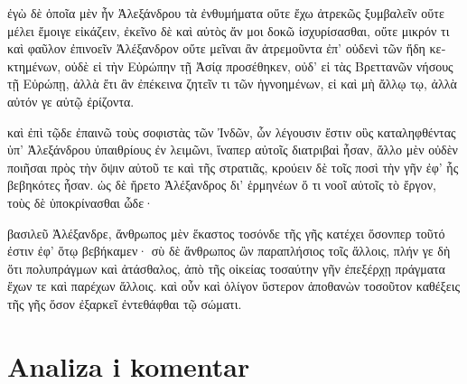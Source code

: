 {\large

\begin{greek}

\noindent  ἐγὼ δὲ ὁποῖα μὲν ἦν Ἀλεξάνδρου τὰ ἐνθυμήματα οὔτε ἔχω ἀτρεκῶς ξυμβαλεῖν οὔτε μέλει ἔμοιγε εἰκάζειν, ἐκεῖνο δὲ καὶ αὐτὸς ἄν μοι δοκῶ ἰσχυρίσασθαι, οὔτε μικρόν τι καὶ φαῦλον ἐπινοεῖν Ἀλέξανδρον οὔτε μεῖναι ἂν ἀτρεμοῦντα ἐπ' οὐδενὶ τῶν ἤδη κεκτημένων, οὐδὲ εἰ τὴν Εὐρώπην τῇ Ἀσίᾳ προσέθηκεν, οὐδ' εἰ τὰς Βρεττανῶν νήσους τῇ Εὐρώπῃ, ἀλλὰ ἔτι ἂν ἐπέκεινα ζητεῖν τι τῶν ἠγνοημένων, εἰ καὶ μὴ ἄλλῳ τῳ, ἀλλὰ αὐτόν γε αὑτῷ ἐρίζοντα.

καὶ ἐπὶ τῷδε ἐπαινῶ τοὺς σοφιστὰς τῶν Ἰνδῶν, ὧν λέγουσιν ἔστιν οὓς καταληφθέντας ὑπ' Ἀλεξάνδρου ὑπαιθρίους ἐν λειμῶνι, ἵναπερ αὐτοῖς διατριβαὶ ἦσαν, ἄλλο μὲν οὐδὲν ποιῆσαι πρὸς τὴν ὄψιν αὐτοῦ τε καὶ τῆς στρατιᾶς, κρούειν δὲ τοῖς ποσὶ τὴν γῆν ἐφ' ἧς βεβηκότες ἦσαν. ὡς δὲ ἤρετο Ἀλέξανδρος δι' ἑρμηνέων ὅ τι νοοῖ αὐτοῖς τὸ ἔργον, τοὺς δὲ ὑποκρίνασθαι ὧδε·

βασιλεῦ Ἀλέξανδρε, ἄνθρωπος μὲν ἕκαστος τοσόνδε τῆς γῆς κατέχει ὅσονπερ τοῦτό ἐστιν ἐφ' ὅτῳ βεβήκαμεν· σὺ δὲ ἄνθρωπος ὢν παραπλήσιος τοῖς ἄλλοις, πλήν γε δὴ ὅτι πολυπράγμων καὶ ἀτάσθαλος, ἀπὸ τῆς οἰκείας τοσαύτην γῆν ἐπεξέρχῃ πράγματα ἔχων τε καὶ παρέχων ἄλλοις. καὶ οὖν καὶ ὀλίγον ὕστερον ἀποθανὼν τοσοῦτον καθέξεις τῆς γῆς ὅσον ἐξαρκεῖ ἐντεθάφθαι τῷ σώματι.

\end{greek}

}


\section*{Analiza i komentar}


